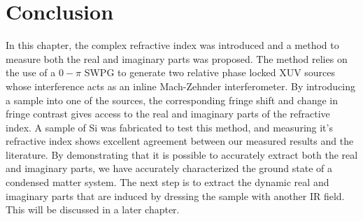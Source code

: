 \section{Conclusion}
In this chapter, the complex refractive index was introduced and a method to measure both the real and imaginary parts was proposed. The method relies on the use of a $0-\pi$ SWPG to generate two relative phase locked XUV sources whose interference acts as an inline Mach-Zehnder interferometer.  By introducing a sample into one of the sources, the corresponding fringe shift and change in fringe contrast gives access to the real and imaginary parts of the refractive index.  A sample of Si was fabricated to test this method, and measuring it's refractive index shows excellent agreement between our measured results and the literature. By demonstrating that it is possible to accurately extract both the real and imaginary parts, we have accurately characterized the ground state of a condensed matter system.  The next step is to extract the dynamic real and imaginary parts that are induced by dressing the sample with another IR field.  This will be discussed in a later chapter.



